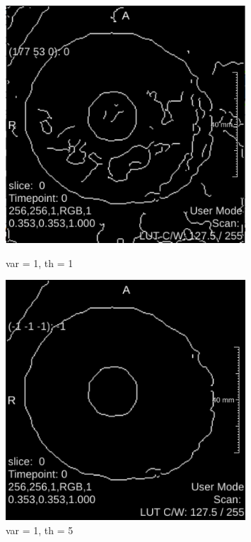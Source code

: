 \documentclass{article}
\begin{document}
\begin{figure}[ht]
\centering
\begin{minipage}{.5\textwidth}
  \centering
  \includegraphics[width=0.8\textwidth]{2canny/2_canny_var_1_th_1_with_scale}
  \caption{var = 1, th = 1}
\label{fg:canny1}
\end{minipage}%
\begin{minipage}{.5\textwidth}
  \centering
  \includegraphics[width=0.8\textwidth]{2canny/2_canny_var_1_th_5_with_scale}
  \caption{var = 1, th = 5}
\label{fg:canny2}
\end{minipage}
\end{figure}
\FloatBarrier
\end{document}
